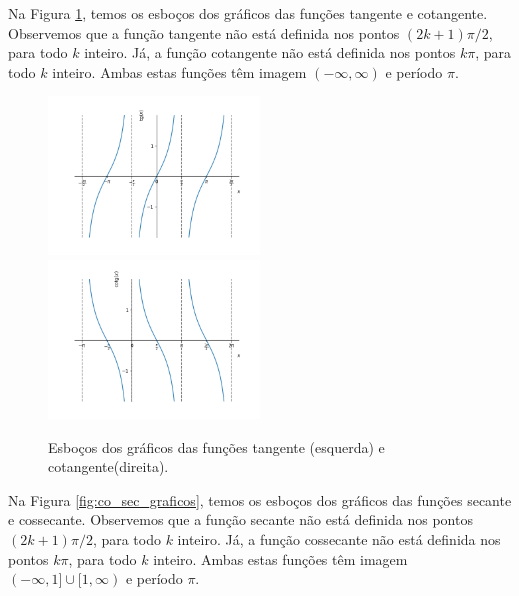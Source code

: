 Na Figura \ref{fig:co_tg_graficos}, temos os esboços dos gráficos das funções tangente e cotangente. Observemos que a função tangente não está definida nos pontos $(2k+1)\pi/2$, para todo $k$ inteiro. Já, a função cotangente não está definida nos pontos $k\pi$, para todo $k$ inteiro. Ambas estas funções têm imagem $(-\infty, \infty)$ e período $\pi$.

\begin{figure}[H]
  \centering
  \includegraphics[width=0.5\textwidth]{./cap_funcao/dados/fig_co_tg_graficos/fig_tg_grafico}~
  \includegraphics[width=0.5\textwidth]{./cap_funcao/dados/fig_co_tg_graficos/fig_cotg_grafico}
  \caption{Esboços dos gráficos das funções tangente (esquerda) e cotangente(direita).}
  \label{fig:co_tg_graficos}
\end{figure}

Na Figura \ref{fig:co_sec_graficos}, temos os esboços dos gráficos das funções secante e cossecante. Observemos que a função secante não está definida nos pontos $(2k+1)\pi/2$, para todo $k$ inteiro. Já, a função cossecante não está definida nos pontos $k\pi$, para todo $k$ inteiro. Ambas estas funções têm imagem $(-\infty, 1]\cup [1, \infty)$ e período $\pi$.

